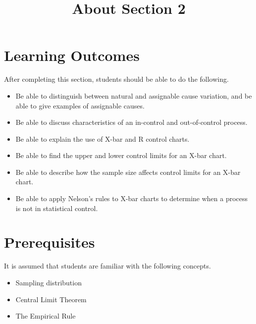 \documentclass{ximera}
\title{About Section 2}
\begin{document}
\begin{abstract}
\end{abstract}
 
\maketitle
 
\section*{Learning Outcomes}
After completing this section, students should be able to do the following.
 
\begin{itemize}
\item Be able to distinguish between natural and assignable cause variation, and be able to give examples of assignable causes.
\item Be able to discuss characteristics of an in-control and out-of-control process.
    \item Be able to explain the use of X-bar and R control charts.
    \item Be able to find the upper and lower control limits for an X-bar chart.
    \item Be able to describe how the sample size affects control limits for an X-bar chart.
    \item Be able to apply Nelson's rules to X-bar charts to determine when a process is not in statistical control.
    
   \end{itemize}

   \section*{Prerequisites}
   It is assumed that students are familiar with the following concepts.
   \begin{itemize}
   \item Sampling distribution
       \item Central Limit Theorem
        \item The Empirical Rule
   \end{itemize}
 
\end{document}
